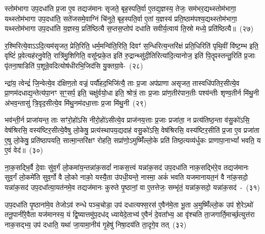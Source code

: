 स्तोम॑भागा उप॒\-दधा॑ति प्र॒जा ए॒व तद्यज॑मानः सृजते॒ बृह॒स्पति॒र्वा ए॒तद्य॒ज्ञस्य॒ तेजः॒ सम॑भर॒द्यथ्स्तोम॑भागा॒ यथ्स्तोम॑भागा उप॒\-दधा॑ति॒ सते॑जसमे॒वाग्निं चि॑नुते॒ बृह॒स्पति॒र्वा ए॒तां य॒ज्ञस्य॑ प्रति॒ष्ठाम॑पश्य॒द्यथ्स्तोम॑भागा॒ यथ्स्तोम॑भागा उप॒\-दधा॑ति य॒ज्ञस्य॒ प्रति॑ष्ठित्यै स॒प्तस॒प्तोप॑ दधाति सवीर्य॒त्वाय॑ ति॒स्रो मध्ये॒ प्रति॑ष्ठित्यै॥~(२७)\ip

{\anuvakamend[{उ॒त्त॒र॒तो ध॑त्ते॒ तस्मा॑दुपधी॒यन्त॒ ऋष॑यो\-ऽसृजत॒ यत् त्रिच॑त्वारिꣳशच्च}]}

र॒श्मिरित्ये॒वा\-ऽऽ\-दि॒त्यम॑सृजत॒ प्रेति॒रिति॒ धर्म॒मन्वि॑ति॒रिति॒ दिवꣳ॑ स॒न्धिरित्य॒न्तरि॑क्षं प्रति॒धिरिति॑ पृथि॒वीं वि॑ष्ट॒म्भ इति॒ वृष्टिं॑ प्र॒वेत्यह॑रनु॒वेति॒ रात्रि॑मु॒शिगिति॒ वसू᳚न्प्रके॒त इति॑ रु॒द्रान्थ्सु॑दी॒तिरित्या॑दि॒त्यानोज॒ इति॑ पि॒तॄꣴस्तन्तु॒रिति॑ प्र॒जाः पृ॑तना॒षाडिति॑ प॒शून्रे॒वदित्योष॑धीरभि॒जिद॑सि यु॒क्तग्रा॒वे-~(२८)\ip

न्द्रा॑य॒ त्वेन्द्रं॑ जि॒न्वेत्ये॒व द॑क्षिण॒तो वज्रं॒ पर्यौ॑हद॒भिजि॑त्यै॒ ताः प्र॒जा अप॑प्राणा असृजत॒ तास्वधि॑\-पतिर॒सीत्ये॒व प्रा॒णम॑दधाद्य॒न्तेत्य॑पा॒नꣳ स॒ꣳ॒सर्प॒ इति॒ चक्षु॑र्वयो॒धा इति॒ श्रोत्रं॒ ताः प्र॒जाः प्रा॑ण॒तीर॑पान॒तीः पश्य॑न्तीः शृण्व॒तीर्न मि॑थु॒नी अ॑भव॒न्तासु॑ त्रि॒वृद॒सीत्ये॒व मि॑थु॒नम॑दधा॒त्ताः प्र॒जा मि॑थु॒नी~(२९)\ip

भव॑न्ती॒र्न प्राजा॑यन्त॒ ताः सꣳ॑रो॒हो॑\-ऽसि नीरो॒हो॑\-ऽसीत्ये॒व प्राज॑नय॒त्ताः प्र॒जाः प्रजा॑ता॒ न प्रत्य॑तिष्ठ॒न्ता व॑सु॒को॑\-ऽसि॒ वेष॑श्रिरसि॒ वस्य॑ष्टिर॒सीत्ये॒वैषु लो॒केषु॒ प्रत्य॑स्थापय॒द्यदाह॑ वसु॒को॑\-ऽसि॒ वेष॑श्रिरसि॒ वस्य॑ष्टिर॒सीति॑ प्र॒जा ए॒व प्रजा॑ता ए॒षु लो॒केषु॒ प्रति॑\-ष्ठापयति॒ सात्मा॒न्तरि॑क्षꣳ रोहति॒ सप्रा॑णो॒\-ऽमुष्मिँ॑ल्लो॒के प्रति॑ तिष्ठ॒त्यव्य॑र्धुकः प्राणापा॒ना\-भ्यां᳚ भवति॒ य ए॒वं वेद॑॥~(३०)\ip

{\anuvakamend[{यु॒क्तग्रा॑वा प्र॒जा मि॑थु॒न्य॑न्तरि॑क्षं॒ द्वाद॑श च}]}

ना॒क॒सद्भि॒र्वै दे॒वाः सु॑व॒र्गं लो॒कमा॑य॒न्तन्ना॑क॒सदां᳚ नाकस॒त्त्वं यन्ना॑क॒सद॑ उप॒\-दधा॑ति नाक॒सद्भि॑रे॒व तद्यज॑मानः सुव॒र्गं लो॒कमे॑ति सुव॒र्गो वै लो॒को नाको॒ यस्यै॒ता उ॑पधी॒यन्ते॒ नास्मा॒ अकं॑ भवति यजमानायत॒नं वै ना॑क॒सदो॒ यन्ना॑क॒सद॑ उप॒दधा᳚त्या॒यत॑नमे॒व तद्यज॑मानः कुरुते पृ॒ष्ठानां॒ वा ए॒तत्तेजः॒ सम्भृ॑तं॒ यन्ना॑क॒सदो॒ यन्ना॑क॒सद॑~-~(३१)\ip

उप॒\-दधा॑ति पृ॒ष्ठाना॑मे॒व तेजो\-ऽव॑ रुन्धे पञ्च॒चोडा॒ उप॑ दधात्यफ्स॒रस॑ ए॒वैन॑मे॒ता भू॒ता अ॒मुष्मिँ॑ल्लो॒क उप॑ शे॒रे\-ऽथो॑ तनू॒पानी॑रे॒वैता यज॑मानस्य॒ यं द्वि॒ष्यात्तमु॑प॒दध॑द् ध्यायेदे॒ताभ्य॑ ए॒वैनं॑ दे॒वता᳚भ्य॒ आ वृ॑श्चति ता॒जगार्ति॒मार्च्छ॒त्युत्त॑रा नाक॒सद्भ्य॒ उप॑ दधाति॒ यथा॑ जा॒यामा॒नीय॑ गृ॒हेषु॑ निषा॒दय॑ति ता॒दृगे॒व तत्~(३२)\ip


